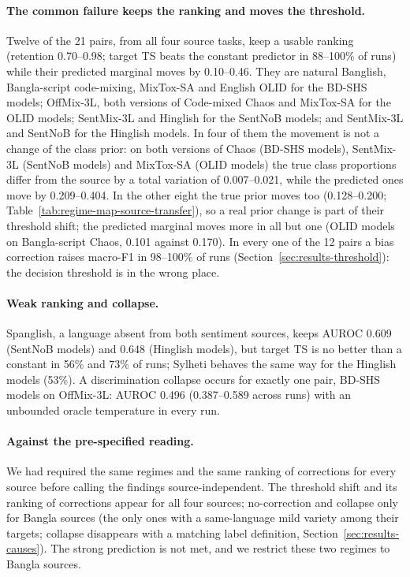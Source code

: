 \paragraph{The common failure keeps the ranking and moves the threshold.}
Twelve of the 21 pairs, from all four source tasks, keep a usable ranking (retention 0.70--0.98; target TS beats the
constant predictor in 88--100\% of runs) while their predicted marginal moves by 0.10--0.46. They are natural Banglish,
Bangla-script code-mixing, MixTox-SA and English OLID for the BD-SHS models; OffMix-3L, both versions of Code-mixed Chaos
and MixTox-SA for the OLID models; SentMix-3L and Hinglish for the SentNoB models; and SentMix-3L and SentNoB for the
Hinglish models. In four of them the movement is not a change of the class prior: on both versions of Chaos (BD-SHS
models), SentMix-3L (SentNoB models) and MixTox-SA (OLID models) the true class proportions differ from the source by a
total variation of 0.007--0.021, while the predicted ones move by 0.209--0.404. In the other eight the true prior moves
too (0.128--0.200; Table~\ref{tab:regime-map-source-transfer}), so a real prior change is part of their threshold shift;
the predicted marginal moves more in all but one (OLID models on Bangla-script Chaos, 0.101 against 0.170). In
every one of the 12 pairs a bias correction raises macro-F1 in 98--100\% of runs
(Section~\ref{sec:results-threshold}): the decision threshold is in the wrong place.

\paragraph{Weak ranking and collapse.}
Spanglish, a language absent from both sentiment sources, keeps AUROC 0.609 (SentNoB models) and 0.648 (Hinglish
models), but target TS is no better than a constant in 56\% and 73\% of runs; Sylheti behaves the same way for the
Hinglish models (53\%). A discrimination collapse occurs for exactly one pair, BD-SHS models on OffMix-3L: AUROC 0.496
(0.387--0.589 across runs) with an unbounded oracle temperature in every run.

\paragraph{Against the pre-specified reading.}
We had required the same regimes and the same ranking of corrections for every source before calling the findings
source-independent. The threshold shift and its ranking of corrections appear for all four sources; no-correction and
collapse only for Bangla sources (the only ones with a same-language mild variety among their targets; collapse
disappears with a matching label definition, Section~\ref{sec:results-causes}). The strong prediction is not met, and
we restrict these two regimes to Bangla sources.

